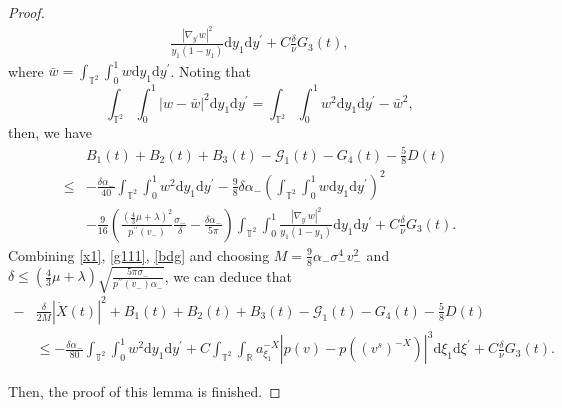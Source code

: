 \documentclass[10pt,reqno]{amsart}
\numberwithin{equation}{section}
\newcommand{\dif}{\mathrm{d}}
\begin{document}
\begin{proof}
\begin{align*}
\frac{|\nabla_{y^\prime}w|^2}{y_1(1-y_1)}
\dif y_1\dif y^{\prime}
+C\frac{\delta}{\nu}G_3(t),
\end{align*}
where $\bar w=\int_{\mathbb{T}^2}\int_0^1
w\dif y_1\dif y^{\prime}$.
Noting that
\[
\int_{\mathbb{T}^2}\int_0^1|w-\bar w|^2
\dif y_1\dif y^{\prime}
=\int_{\mathbb{T}^2}\int_0^1w^2
\dif y_1\dif y^{\prime}
-\bar w^2,
\]
then, we have
\begin{equation}\label{bdg}
\begin{aligned}
&B_1(t)+B_2(t)+B_3(t)-\mathcal{G}_1(t)-G_4(t)-\frac{5}{8}D(t)\\
\le&
-\frac{\delta\alpha_-}{40}\int_{\mathbb{T}^2}\int_0^1
w^2\dif y_1\dif y^{\prime}
-\frac{9}{8}\delta\alpha_-\left(\int_{\mathbb{T}^2}\int_0^1w
\dif y_1\dif y^{\prime}\right)^2\\
&
-\frac{9}{16}\left(\frac{(\frac{4}{3}\mu+\lambda)^2}{p^{\prime\prime}(v_-)}\frac{\sigma_-}{\delta}
-\frac{\delta\alpha_-}{5\pi}
\right)
\int_{\mathbb{T}^2}\int_0^1
\frac{|\nabla_{y^\prime}w|^2}{y_1(1-y_1)}
\dif y_1\dif y^{\prime}
+C\frac{\delta}{\nu}G_3(t).
\end{aligned}
\end{equation}
Combining \eqref{x1}, \eqref{g111}, \eqref{bdg} and choosing $M=\frac{9}{8}\alpha_-\sigma_-^4v_-^2$ and $\delta\le(\frac{4}{3}\mu+\lambda)\sqrt{\frac{5\pi\sigma_-}{p^{\prime\prime}(v_-)\alpha_-}}$, we can deduce that
\[
\begin{aligned}
-&\frac{\delta}{2M}|\dot X(t)|^2+B_1(t)+B_2(t)+B_3(t)-\mathcal{G}_1(t)-G_4(t)-\frac{5}{8}D(t)\\
&\le
-\frac{\delta\alpha_-}{80}\int_{\mathbb{T}^2}\int_0^1
w^2\dif y_1\dif y^{\prime}
+C\int_{\mathbb{T}^2}\int_{\mathbb{R}}a^{-X}_{\xi_1} |p(v)-p((v^s)^{-X})|^3\dif \xi_1\dif \xi^{\prime}
+C\frac{\delta}{\nu}G_3(t).
\end{aligned}
\]

Then, the proof of this lemma is finished.
\end{proof}
\end{document}
